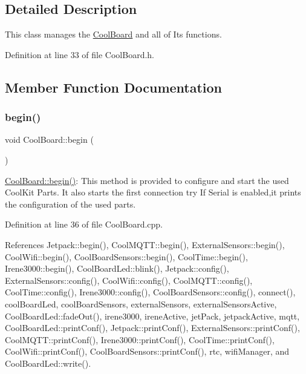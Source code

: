 \subsection{Detailed Description}
This class manages the \hyperlink{classCoolBoard}{Cool\+Board} and all of Its functions. 

Definition at line 33 of file Cool\+Board.\+h.



\subsection{Member Function Documentation}
\mbox{\label{classCoolBoard_acba7c5aef7268b2c0044bdb54d3b9d76}} 
\subsubsection{\texorpdfstring{begin()}{begin()}}
{\footnotesize\ttfamily void Cool\+Board\+::begin (\begin{DoxyParamCaption}{ }\end{DoxyParamCaption})}

\hyperlink{classCoolBoard_acba7c5aef7268b2c0044bdb54d3b9d76}{Cool\+Board\+::begin()}\+: This method is provided to configure and start the used Cool\+Kit Parts. It also starts the first connection try If Serial is enabled,it prints the configuration of the used parts. 

Definition at line 36 of file Cool\+Board.\+cpp.



References Jetpack\+::begin(), Cool\+M\+Q\+T\+T\+::begin(), External\+Sensors\+::begin(), Cool\+Wifi\+::begin(), Cool\+Board\+Sensors\+::begin(), Cool\+Time\+::begin(), Irene3000\+::begin(), Cool\+Board\+Led\+::blink(), Jetpack\+::config(), External\+Sensors\+::config(), Cool\+Wifi\+::config(), Cool\+M\+Q\+T\+T\+::config(), Cool\+Time\+::config(), Irene3000\+::config(), Cool\+Board\+Sensors\+::config(), connect(), cool\+Board\+Led, cool\+Board\+Sensors, external\+Sensors, external\+Sensors\+Active, Cool\+Board\+Led\+::fade\+Out(), irene3000, irene\+Active, jet\+Pack, jetpack\+Active, mqtt, Cool\+Board\+Led\+::print\+Conf(), Jetpack\+::print\+Conf(), External\+Sensors\+::print\+Conf(), Cool\+M\+Q\+T\+T\+::print\+Conf(), Irene3000\+::print\+Conf(), Cool\+Time\+::print\+Conf(), Cool\+Wifi\+::print\+Conf(), Cool\+Board\+Sensors\+::print\+Conf(), rtc, wifi\+Manager, and Cool\+Board\+Led\+::write().


